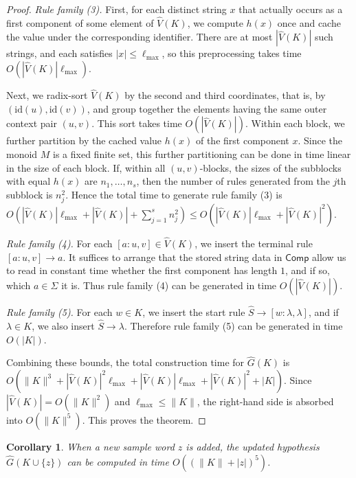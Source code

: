 \documentclass[11pt,a4paper]{article}
\newtheorem{corollary}[theorem]{Corollary}
\begin{document}
\begin{proof}
\smallskip\noindent\emph{Rule family \textup{(3)}.}
First, for each distinct string $x$ that actually occurs as a first component of some element of $\hat V(K)$, we compute $h(x)$ once and cache the value under the corresponding identifier. There are at most $|\hat V(K)|$ such strings, and each satisfies $|x|\le \ell_{\max}$, so this preprocessing takes time $O(|\hat V(K)|\ell_{\max})$.

Next, we radix-sort $\hat V(K)$ by the second and third coordinates, that is, by $(\mathrm{id}(u),\mathrm{id}(v))$, and group together the elements having the same outer context pair $(u,v)$. This sort takes time $O(|\hat V(K)|)$. Within each block, we further partition by the cached value $h(x)$ of the first component $x$. Since the monoid $M$ is a fixed finite set, this further partitioning can be done in time linear in the size of each block. If, within all $(u,v)$-blocks, the sizes of the subblocks with equal $h(x)$ are $n_1,\dots,n_s$, then the number of rules generated from the $j$th subblock is $n_j^2$. Hence the total time to generate rule family \textup{(3)} is $O(|\hat V(K)|\ell_{\max}+|\hat V(K)|+\sum_{j=1}^s n_j^2)\le O(|\hat V(K)|\ell_{\max}+|\hat V(K)|^2)$.

\smallskip\noindent\emph{Rule family \textup{(4)}.}
For each $[a:u,v]\in\hat V(K)$, we insert the terminal rule $[a:u,v]\to a$. It suffices to arrange that the stored string data in $\mathsf{Comp}$ allow us to read in constant time whether the first component has length $1$, and if so, which $a\in\Sigma$ it is. Thus rule family \textup{(4)} can be generated in time $O(|\hat V(K)|)$.

\smallskip\noindent\emph{Rule family \textup{(5)}.}
For each $w\in K$, we insert the start rule $\hat S\to [w:\lambda,\lambda]$, and if $\lambda\in K$, we also insert $\hat S\to\lambda$. Therefore rule family \textup{(5)} can be generated in time $O(|K|)$.

Combining these bounds, the total construction time for $\hat G(K)$ is $O(\|K\|^3+|\hat V(K)|^2\ell_{\max}+|\hat V(K)|\ell_{\max}+|\hat V(K)|^2+|K|)$. Since $|\hat V(K)|=O(\|K\|^2)$ and $\ell_{\max}\le \|K\|$, the right-hand side is absorbed into $O(\|K\|^5)$. This proves the theorem.
\end{proof}

\begin{corollary}\label{cor:poly-update}
When a new sample word $z$ is added, the updated hypothesis $\hat G(K\cup\{z\})$ can be computed in time $O((\|K\|+|z|)^5)$.
\end{corollary}
\end{document}
